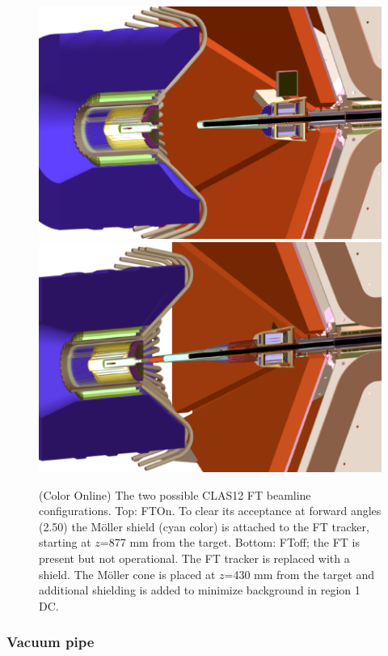 \begin{figure}
	\centering
	\includegraphics[width=0.99\columnwidth,keepaspectratio]{img/ftOnGeometry.png}
	\includegraphics[width=0.99\columnwidth,keepaspectratio]{img/ftOffGeometry.png}
	\caption{(Color Online) The two possible CLAS12 FT beamline configurations. Top: FTOn. To clear its acceptance at forward angles (2.50\mdeg)
             the M\"oller shield (cyan color) is attached to the FT tracker, starting at $z$=877 mm from the target.
             Bottom: FToff; the FT is present but not operational. The FT tracker is replaced with a shield.
             The M\"oller cone is placed at $z$=430 mm from the target and additional shielding
             is added to minimize background in region 1 DC.}
	\label{fig:beamlineGeometry}
\end{figure}

\subsubsection{Vacuum pipe}

